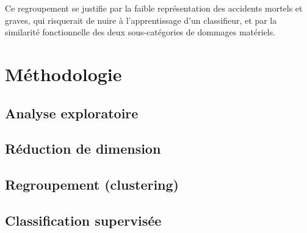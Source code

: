 \documentclass[12pt]{article}
\begin{document}
Ce regroupement se justifie par la faible représentation des accidents
mortels et graves, qui risquerait de nuire à l'apprentissage d'un
classifieur, et par la similarité fonctionnelle des deux sous-catégories
de dommages matériels.
 
\section{Méthodologie}

 
 
\subsection{Analyse exploratoire}
 
 
\subsection{Réduction de dimension}
 
 
\subsection{Regroupement (clustering)}
 
 
\subsection{Classification supervisée}
 
 
 
\end{document}
